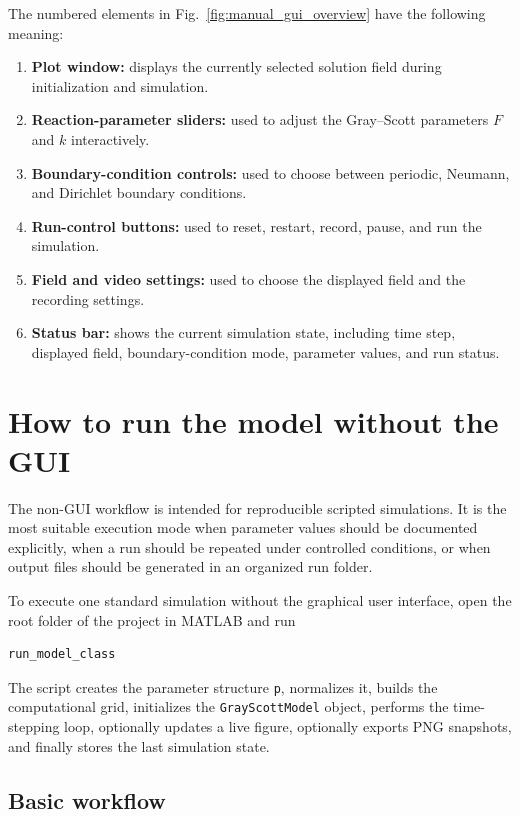 The numbered elements in Fig.~\ref{fig:manual_gui_overview} have the following meaning:

\begin{enumerate}
    \item \textbf{Plot window:} displays the currently selected solution field during initialization and simulation.
    \item \textbf{Reaction-parameter sliders:} used to adjust the Gray--Scott parameters \(F\) and \(k\) interactively.
    \item \textbf{Boundary-condition controls:} used to choose between periodic, Neumann, and Dirichlet boundary conditions.
    \item \textbf{Run-control buttons:} used to reset, restart, record, pause, and run the simulation.
    \item \textbf{Field and video settings:} used to choose the displayed field and the recording settings.
    \item \textbf{Status bar:} shows the current simulation state, including time step, displayed field, boundary-condition mode, parameter values, and run status.
\end{enumerate}

\section{How to run the model without the GUI}
\label{sec:manual_nongui}

The non-GUI workflow is intended for reproducible scripted simulations. It is the most suitable execution mode when parameter values should be documented explicitly, when a run should be repeated under controlled conditions, or when output files should be generated in an organized run folder.

To execute one standard simulation without the graphical user interface, open the root folder of the project in MATLAB and run

\begin{verbatim}
run_model_class
\end{verbatim}

The script creates the parameter structure \texttt{p}, normalizes it, builds the computational grid, initializes the \texttt{GrayScottModel} object, performs the time-stepping loop, optionally updates a live figure, optionally exports PNG snapshots, and finally stores the last simulation state.

\subsection*{Basic workflow}

